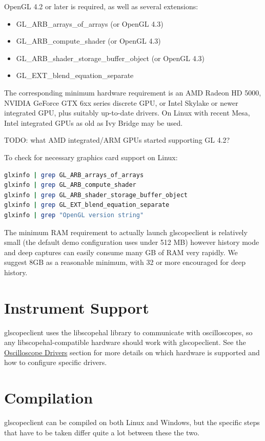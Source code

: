 OpenGL 4.2 or later is required, as well as several extensions:
\begin{itemize}
\item GL\_ARB\_arrays\_of\_arrays (or OpenGL 4.3)
\item GL\_ARB\_compute\_shader (or OpenGL 4.3)
\item GL\_ARB\_shader\_storage\_buffer\_object (or OpenGL 4.3)
\item GL\_EXT\_blend\_equation\_separate
\end{itemize}

The corresponding minimum hardware requirement is an AMD Radeon HD 5000, NVIDIA GeForce GTX 6xx series discrete GPU, or
Intel Skylake or newer integrated GPU, plus suitably up-to-date drivers. On Linux with recent Mesa, Intel integrated
GPUs as old as Ivy Bridge may be used.

TODO: what AMD integrated/ARM GPUs started supporting GL 4.2?

To check for necessary graphics card support on Linux:
\begin{lstlisting}[language=sh, numbers=none]
glxinfo | grep GL_ARB_arrays_of_arrays
glxinfo | grep GL_ARB_compute_shader
glxinfo | grep GL_ARB_shader_storage_buffer_object
glxinfo | grep GL_EXT_blend_equation_separate
glxinfo | grep "OpenGL version string"
\end{lstlisting}

The minimum RAM requirement to actually launch glscopeclient is relatively small (the default demo configuration uses
under 512 MB) however history mode and deep captures can easily consume many GB of RAM very rapidly. We suggest 8GB as
a reasonable minimum, with 32 or more encouraged for deep history.

\section{Instrument Support}

glscopeclient uses the libscopehal library to communicate with oscilloscopes, so any libscopehal-compatible hardware
should work with glscopeclient. See the \hyperref[sec:drivers]{Oscilloscope Drivers} section for more details on which
hardware is supported and how to configure specific drivers.

\section{Compilation}

glscopeclient can be compiled on both Linux and Windows, but the specific steps that have to be taken differ quite a
lot between these the two.

